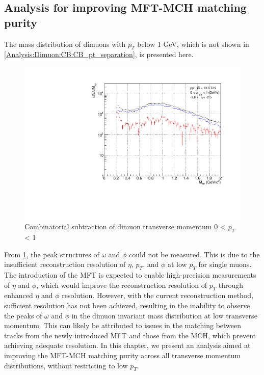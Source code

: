     \subsection{Analysis for improving MFT-MCH matching purity}
    \label{matching improvements}
        The mass distribution of dimuons with \( p_T \) below 1 GeV, which is not shown in \ref{Analysis:Dimuon:CB:CB_pt_separation}, is presented here.
        \begin{figure}
            \centering
            \includegraphics[keepaspectratio, scale=0.4]{fig/3_6_CB_pt0to1.pdf}
            \caption{Combinatorial subtraction of dimuon transverse momentum 0 < $p_T$ < 1}
            \label{Analysis:Dimuon:pt0to1}
        \end{figure}
        From \ref{Analysis:Dimuon:pt0to1}, the peak structures of \(\omega\) and \(\phi\) could not be measured. This is due to the insufficient reconstruction resolution of \(\eta\), \(p_T\), and \(\phi\) at low \(p_T\) for single muons. The introduction of the MFT is expected to enable high-precision measurements of \(\eta\) and \(\phi\), which would improve the reconstruction resolution of \(p_T\) through enhanced \(\eta\) and \(\phi\) resolution. However, with the current reconstruction method, sufficient resolution has not been achieved, resulting in the inability to observe the peaks of \(\omega\) and \(\phi\) in the dimuon invariant mass distribution at low transverse momentum. This can likely be attributed to issues in the matching between tracks from the newly introduced MFT and those from the MCH, which prevent achieving adequate resolution. In this chapter, we present an analysis aimed at improving the MFT-MCH matching purity across all transverse momentum distributions, without restricting to low \(p_T\).\@

